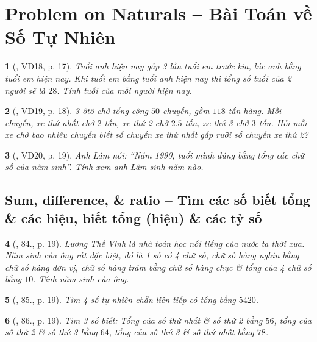 \documentclass{article}
\newtheorem{baitoan}{}
\begin{document}

\section{Problem on Naturals -- Bài Toán về Số Tự Nhiên}

\begin{baitoan}[\cite{Binh_Toan_6_tap_1}, VD18, p. 17]
	Tuổi anh hiện nay gấp 3 lần tuổi em trước kia, lúc anh bằng tuổi em hiện nay. Khi tuổi em bằng tuổi anh hiện nay thì tổng số tuổi của 2 người sẽ là $28$. Tính tuổi của mỗi người hiện nay.
\end{baitoan}

\begin{baitoan}[\cite{Binh_Toan_6_tap_1}, VD19, p. 18]
	3 ôtô chở tổng cộng $50$ chuyến, gồm $118$ tấn hàng. Mỗi chuyến, xe thứ nhất chở $2$ tấn, xe thứ 2 chở $2.5$ tấn, xe thứ 3 chở $3$ tấn. Hỏi mỗi xe chở bao nhiêu chuyến biết số chuyến xe thứ nhất gấp rưỡi số chuyến xe thứ 2?
\end{baitoan}

\begin{baitoan}[\cite{Binh_Toan_6_tap_1}, VD20, p. 19]
	Anh Lâm nói: ``Năm 1990, tuổi mình đúng bằng tổng các chữ số của năm sinh''. Tính xem anh Lâm sinh năm nào.
\end{baitoan}

\subsection{Sum, difference, \& ratio -- Tìm các số biết tổng \& các hiệu, biết tổng (hiệu) \& các tỷ số}

\begin{baitoan}[\cite{Binh_Toan_6_tap_1}, 84., p. 19]
	Lương Thế Vinh là nhà toán học nổi tiếng của nước ta thời xưa. Năm sinh của ông rất đặc biệt, đó là 1 số có 4 chữ số, chữ số hàng nghìn bằng chữ số hàng đơn vị, chữ số hàng trăm bằng chữ số hàng chục \& tổng của 4 chữ số bằng $10$. Tính năm sinh của ông.
\end{baitoan}

\begin{baitoan}[\cite{Binh_Toan_6_tap_1}, 85., p. 19]
	Tìm 4 số tự nhiên chẵn liên tiếp có tổng bằng $5420$.
\end{baitoan}

\begin{baitoan}[\cite{Binh_Toan_6_tap_1}, 86., p. 19]
	Tìm 3 số biết: Tổng của số thứ nhất \& số thứ 2 bằng $56$, tổng của số thứ 2 \& số thứ 3 bằng $64$, tổng của số thứ 3 \& số thứ nhất bằng $78$.
\end{baitoan}
\end{document}
